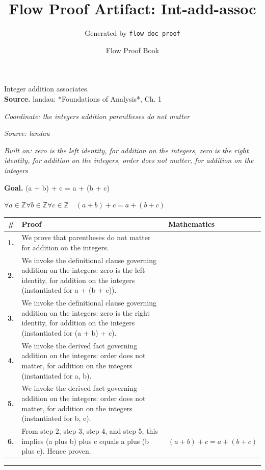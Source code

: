 \documentclass[11pt]{article}
\title{Flow Proof Artifact: Int-add-assoc}
\author{Generated by \texttt{flow doc proof}}
\date{Flow Proof Book}
\theoremstyle{definition}
\begin{document}
\maketitle
Integer addition associates.\\[0.5em]
\textbf{Source.} landau: *Foundations of Analysis*, Ch. 1\\[0.5em]
\bigskip
{}\par
\smallskip\noindent\textit{Coordinate: the integers \cdot addition \cdot parentheses do not matter}\par
\smallskip\noindent\textit{Source: landau}\par
\smallskip\noindent\textit{Built on: zero is the left identity, for addition on the integers, zero is the right identity, for addition on the integers, order does not matter, for addition on the integers}\par
\medskip
\noindent\textbf{Goal.} (a + b) + c = a + (b + c)\par
\noindent$\displaystyle \forall a \in \mathbb{Z} \forall b \in \mathbb{Z} \forall c \in \mathbb{Z}\quad (a + b) + c = a + (b + c)$\par
\medskip
\noindent
\begin{tabular}{@{} >{\raggedright\arraybackslash}p{} >{\raggedright\arraybackslash}p{} >{\raggedleft\arraybackslash}p{} @{}}
\textbf{\#} & \textbf{Proof} & \textbf{Mathematics} \\
\midrule
\textbf{1.} & We prove that parentheses do not matter for addition on the integers. & \\[0.45em]
\textbf{2.} & We invoke the definitional clause governing addition on the integers: zero is the left identity, for addition on the integers (instantiated for a + (b + c)). & \\[0.45em]
\textbf{3.} & We invoke the definitional clause governing addition on the integers: zero is the right identity, for addition on the integers (instantiated for (a + b) + c). & \\[0.45em]
\textbf{4.} & We invoke the derived fact governing addition on the integers: order does not matter, for addition on the integers (instantiated for a, b). & \\[0.45em]
\textbf{5.} & We invoke the derived fact governing addition on the integers: order does not matter, for addition on the integers (instantiated for b, c). & \\[0.45em]
\textbf{6.} & From step 2, step 3, step 4, and step 5, this implies (a plus b) plus c equals a plus (b plus c). Hence proven. & $\displaystyle (a + b) + c = a + (b + c)$ \\[0.45em]
\bottomrule
\end{tabular}
\label{thm:Int-addition-parentheses_do_not_matter}
\par\medskip\hrule
\end{document}
